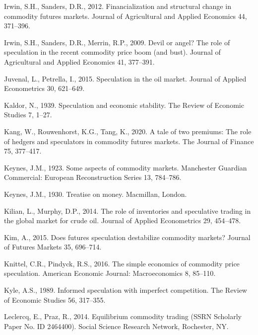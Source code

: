 \documentclass[]{elsarticle} %
\begin{document}
\leavevmode\hypertarget{ref-irwin_financialisation_2012}{}%
Irwin, S.H., Sanders, D.R., 2012. Financialization and structural change in commodity futures markets. Journal of Agricultural and Applied Economics 44, 371--396.

\leavevmode\hypertarget{ref-irwin_devil_2009}{}%
Irwin, S.H., Sanders, D.R., Merrin, R.P., 2009. Devil or angel? The role of speculation in the recent commodity price boom (and bust). Journal of Agricultural and Applied Economics 41, 377--391.

\leavevmode\hypertarget{ref-juvenal_speculation_2015}{}%
Juvenal, L., Petrella, I., 2015. Speculation in the oil market. Journal of Applied Econometrics 30, 621--649.

\leavevmode\hypertarget{ref-kaldor_speculation_1939}{}%
Kaldor, N., 1939. Speculation and economic stability. The Review of Economic Studies 7, 1--27.

\leavevmode\hypertarget{ref-kang_tale_2020}{}%
Kang, W., Rouwenhorst, K.G., Tang, K., 2020. A tale of two premiums: The role of hedgers and speculators in commodity futures markets. The Journal of Finance 75, 377--417.

\leavevmode\hypertarget{ref-keynes_some_1923}{}%
Keynes, J.M., 1923. Some aspects of commodity markets. Manchester Guardian Commercial: European Reconstruction Series 13, 784--786.

\leavevmode\hypertarget{ref-keynes_treatise_1930}{}%
Keynes, J.M., 1930. Treatise on money. Macmillan, London.

\leavevmode\hypertarget{ref-kilian_role_2014}{}%
Kilian, L., Murphy, D.P., 2014. The role of inventories and speculative trading in the global market for crude oil. Journal of Applied Econometrics 29, 454--478.

\leavevmode\hypertarget{ref-kim_does_2015}{}%
Kim, A., 2015. Does futures speculation destabilize commodity markets? Journal of Futures Markets 35, 696--714.

\leavevmode\hypertarget{ref-knittel_simple_2016}{}%
Knittel, C.R., Pindyck, R.S., 2016. The simple economics of commodity price speculation. American Economic Journal: Macroeconomics 8, 85--110.

\leavevmode\hypertarget{ref-kyle_informed_1989}{}%
Kyle, A.S., 1989. Informed speculation with imperfect competition. The Review of Economic Studies 56, 317--355.

\leavevmode\hypertarget{ref-leclercq_equilibrium_2014}{}%
Leclercq, E., Praz, R., 2014. Equilibrium commodity trading (SSRN Scholarly Paper No. ID 2464400). Social Science Research Network, Rochester, NY.
\end{document}
